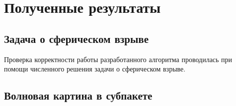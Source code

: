 \section{Полученные результаты}
\subsection{Задача о сферическом взрыве}
Проверка корректности работы разработанного алгоритма проводилась при помощи численного решения задачи о сферическом взрыве.
\subsection{Волновая картина в субпакете}
